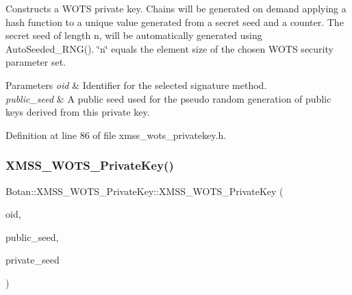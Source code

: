 Constructs a W\+O\+TS private key. Chains will be generated on demand applying a hash function to a unique value generated from a secret seed and a counter. The secret seed of length n, will be automatically generated using Auto\+Seeded\+\_\+\+R\+N\+G(). \char`\"{}n\char`\"{} equals the element size of the chosen W\+O\+TS security parameter set.


\begin{DoxyParams}{Parameters}
{\em oid} & Identifier for the selected signature method. \\
\hline
{\em public\+\_\+seed} & A public seed used for the pseudo random generation of public keys derived from this private key. \\
\hline
\end{DoxyParams}


Definition at line 86 of file xmss\+\_\+wots\+\_\+privatekey.\+h.

\mbox{\label{class_botan_1_1_x_m_s_s___w_o_t_s___private_key_aadd32d2c3fb5045d5a1cec31d85cdbce}} 
\subsubsection{\texorpdfstring{X\+M\+S\+S\+\_\+\+W\+O\+T\+S\+\_\+\+Private\+Key()}{XMSS\_WOTS\_PrivateKey()}\hspace{0.1cm}{\footnotesize\ttfamily [5/5]}}
{\footnotesize\ttfamily Botan\+::\+X\+M\+S\+S\+\_\+\+W\+O\+T\+S\+\_\+\+Private\+Key\+::\+X\+M\+S\+S\+\_\+\+W\+O\+T\+S\+\_\+\+Private\+Key (\begin{DoxyParamCaption}\item[{X\+M\+S\+S\+\_\+\+W\+O\+T\+S\+\_\+\+Parameters\+::ots\+\_\+algorithm\+\_\+t}]{oid,  }\item[{const secure\+\_\+vector$<$ uint8\+\_\+t $>$ \&}]{public\+\_\+seed,  }\item[{const secure\+\_\+vector$<$ uint8\+\_\+t $>$ \&}]{private\+\_\+seed }\end{DoxyParamCaption})\hspace{0.3cm}{\ttfamily [inline]}}

